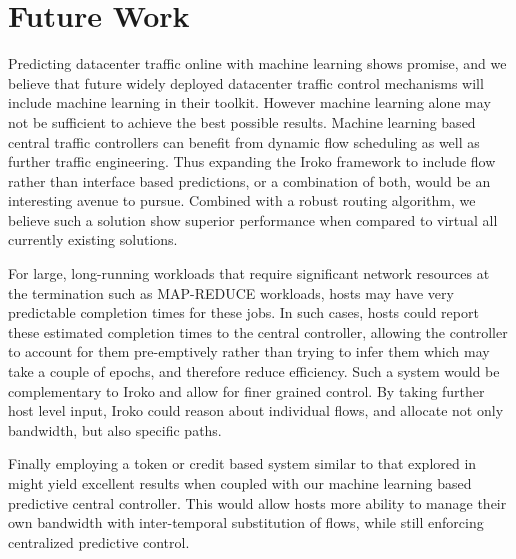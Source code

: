 \section{Future Work}
\label{sec:future}

Predicting datacenter traffic online with machine learning shows promise, and we believe that 
future widely deployed datacenter traffic control mechanisms will include
machine learning in their toolkit. However machine learning alone may not
be sufficient to achieve the best possible results. Machine learning
based central traffic controllers can benefit from dynamic flow
scheduling as well as further traffic engineering. Thus expanding
the Iroko framework to include flow rather than interface based 
predictions, or a combination of both, would be an interesting 
avenue to pursue. Combined with a robust routing algorithm, we
believe such a solution show superior performance when
compared to virtual all currently existing solutions.

For large, long-running workloads that require significant 
network resources at the termination such as MAP-REDUCE
workloads, hosts may have very predictable completion times
for these jobs. In such cases, hosts could report these 
estimated completion times to the central controller,
allowing the controller to account for them pre-emptively
rather than trying to infer them which may take a couple
of epochs, and therefore reduce efficiency. Such a
system would be complementary to Iroko and
allow for finer grained control. By taking further
host level input, Iroko could reason about individual 
flows, and allocate not only bandwidth, but also 
specific paths.

Finally employing a token or credit based system similar
to that explored in \cite{expresspass} might yield excellent
results when coupled with our machine learning based predictive
central controller. This would allow hosts more ability to manage
their own bandwidth with inter-temporal substitution of flows,
while still enforcing centralized predictive control.

